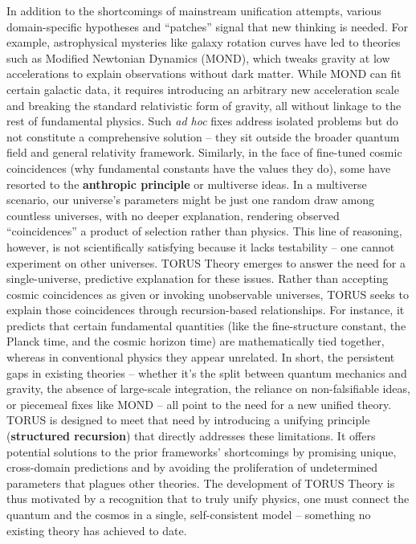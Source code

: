 \documentclass[]{article}
\begin{document}
In addition to the shortcomings of mainstream unification attempts,
various domain-specific hypotheses and ``patches'' signal that new
thinking is needed. For example, astrophysical mysteries like galaxy
rotation curves have led to theories such as Modified Newtonian Dynamics
(MOND), which tweaks gravity at low accelerations to explain
observations without dark matter. While MOND can fit certain galactic
data, it requires introducing an arbitrary new acceleration scale and
breaking the standard relativistic form of gravity, all without linkage
to the rest of fundamental physics. Such \emph{ad hoc} fixes address
isolated problems but do not constitute a comprehensive solution -- they
sit outside the broader quantum field and general relativity framework.
Similarly, in the face of fine-tuned cosmic coincidences (why
fundamental constants have the values they do), some have resorted to
the \textbf{anthropic principle} or multiverse ideas. In a multiverse
scenario, our universe's parameters might be just one random draw among
countless universes, with no deeper explanation, rendering observed
``coincidences'' a product of selection rather than physics. This line
of reasoning, however, is not scientifically satisfying because it lacks
testability -- one cannot experiment on other universes. TORUS Theory
emerges to answer the need for a single-universe, predictive explanation
for these issues. Rather than accepting cosmic coincidences as given or
invoking unobservable universes, TORUS seeks to explain those
coincidences through recursion-based relationships. For instance, it
predicts that certain fundamental quantities (like the fine-structure
constant, the Planck time, and the cosmic horizon time) are
mathematically tied together, whereas in conventional physics they
appear unrelated. In short, the persistent gaps in existing theories --
whether it's the split between quantum mechanics and gravity, the
absence of large-scale integration, the reliance on non-falsifiable
ideas, or piecemeal fixes like MOND -- all point to the need for a new
unified theory. TORUS is designed to meet that need by introducing a
unifying principle (\textbf{structured recursion}) that directly
addresses these limitations. It offers potential solutions to the prior
frameworks' shortcomings by promising unique, cross-domain predictions
and by avoiding the proliferation of undetermined parameters that
plagues other theories. The development of TORUS Theory is thus
motivated by a recognition that to truly unify physics, one must connect
the quantum and the cosmos in a single, self-consistent model --
something no existing theory has achieved to date.
\end{document}
